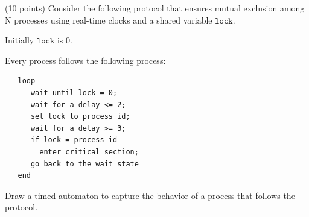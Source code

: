 \documentclass[a4paper, 12pt]{article}
\begin{document}
\newpage
\begin{problem}{}
(10 points)
Consider the following protocol that ensures mutual exclusion among N processes
using real-time clocks and a shared variable $\texttt{lock}$.

Initially $\texttt{lock}$ is 0.

Every process follows the following process:

\begin{verbatim}
   loop
      wait until lock = 0;
      wait for a delay <= 2;
      set lock to process id;
      wait for a delay >= 3;
      if lock = process id 
      	enter critical section;
      go back to the wait state     
   end
\end{verbatim}
Draw a timed automaton to capture the behavior of a process that follows the protocol.

\noindent
\\
\\
\begin{minipage}{1\textwidth}
		\rectangle{\linewidth}{16cm}
\end{minipage}
\newpage
\ \\
\begin{minipage}{1\textwidth}
		\rectangle{\linewidth}{24cm}
\end{minipage}
\newpage
\ \\
\begin{minipage}{1\textwidth}
		\rectangle{\linewidth}{24cm}
\end{minipage}
\newpage
\ \\
\begin{minipage}{1\textwidth}
		\rectangle{\linewidth}{24cm}
\end{minipage}
\end{problem}
\end{document}
